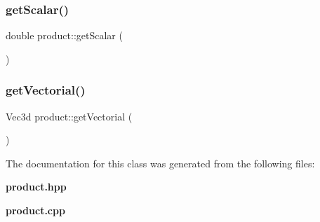 \subsubsection{get\+Scalar()}
{\footnotesize\ttfamily double product\+::get\+Scalar (\begin{DoxyParamCaption}{ }\end{DoxyParamCaption})}

\mbox{\label{classproduct_a22749e150ec6baffd629cd037bbf72cd}} 
\subsubsection{get\+Vectorial()}
{\footnotesize\ttfamily Vec3d product\+::get\+Vectorial (\begin{DoxyParamCaption}{ }\end{DoxyParamCaption})}



The documentation for this class was generated from the following files\+:\begin{DoxyCompactItemize}
\item 
\textbf{ product.\+hpp}\item 
\textbf{ product.\+cpp}\end{DoxyCompactItemize}
